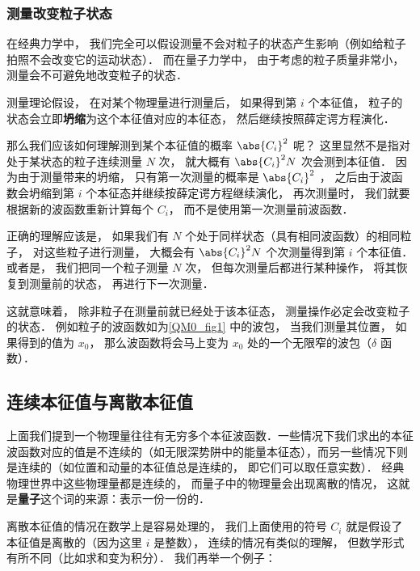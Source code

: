 \subsubsection{测量改变粒子状态}
在经典力学中， 我们完全可以假设测量不会对粒子的状态产生影响（例如给粒子拍照不会改变它的运动状态）． 而在量子力学中， 由于考虑的粒子质量非常小， 测量会不可避免地改变粒子的状态．

测量理论假设， 在对某个物理量进行测量后， 如果得到第 $i$ 个本征值， 粒子的状态会立即\textbf{坍缩}为这个本征值对应的本征态， 然后继续按照薛定谔方程演化．

那么我们应该如何理解测到某个本征值的概率 $\abs{C_i}^2$ 呢？ 这里显然不是指对处于某状态的粒子连续测量 $N$ 次， 就大概有 $\abs{C_i}^2 N$ 次会测到本征值． 因为由于测量带来的坍缩， 只有第一次测量的概率是 $\abs{C_i}^2$ ， 之后由于波函数会坍缩到第 $i$ 个本征态并继续按薛定谔方程继续演化， 再次测量时， 我们就要根据新的波函数重新计算每个 $C_i$， 而不是使用第一次测量前波函数．

正确的理解应该是， 如果我们有 $N$ 个处于同样状态（具有相同波函数）的相同粒子， 对这些粒子进行测量， 大概会有 $\abs{C_i}^2 N$ 个次测量得到第 $i$ 个本征值． 或者是， 我们把同一个粒子测量 $N$ 次， 但每次测量后都进行某种操作， 将其恢复到测量前的状态， 再进行下一次测量．

这就意味着， 除非粒子在测量前就已经处于该本征态， 测量操作必定会改变粒子的状态． 例如粒子的波函数如为\autoref{QM0_fig1} 中的波包， 当我们测量其位置， 如果得到的值为 $x_0$， 那么波函数将会马上变为 $x_0$ 处的一个无限窄的波包（$\delta$ 函数）．

\subsection{连续本征值与离散本征值}
上面我们提到一个物理量往往有无穷多个本征波函数．一些情况下我们求出的本征波函数对应的值是不连续的（如无限深势阱中的能量本征态），而另一些情况下则是连续的（如位置和动量的本征值总是连续的， 即它们可以取任意实数）． 经典物理世界中这些物理量都是连续的， 而量子中的物理量会出现离散的情况， 这就是\textbf{量子}这个词的来源：表示一份一份的．

离散本征值的情况在数学上是容易处理的， 我们上面使用的符号 $C_i$ 就是假设了本征值是离散的（因为这里 $i$ 是整数）， 连续的情况有类似的理解， 但数学形式有所不同（比如求和变为积分）． 我们再举一个例子：


